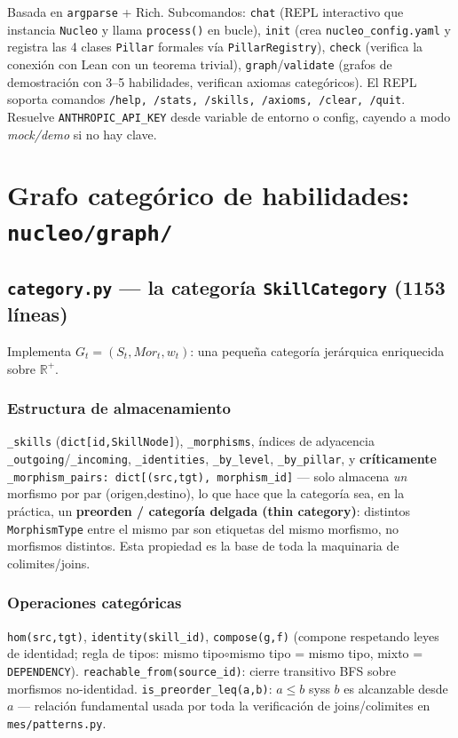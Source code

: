 \documentclass[11pt,a4paper]{report}
\newcommand{\code}[1]{\texttt{#1}}
\begin{document}
Basada en \code{argparse} + Rich. Subcomandos: \code{chat} (REPL interactivo que instancia \code{Nucleo} y llama \code{process()} en bucle), \code{init} (crea \code{nucleo_config.yaml} y registra las 4 clases \code{Pillar} formales v\'ia \code{PillarRegistry}), \code{check} (verifica la conexi\'on con Lean con un teorema trivial), \code{graph}/\code{validate} (grafos de demostraci\'on con 3--5 habilidades, verifican axiomas categ\'oricos). El REPL soporta comandos \code{/help, /stats, /skills, /axioms, /clear, /quit}. Resuelve \code{ANTHROPIC_API_KEY} desde variable de entorno o config, cayendo a modo \emph{mock/demo} si no hay clave.

\chapter{Grafo categ\'orico de habilidades: \code{nucleo/graph/}}

\section{\code{category.py} --- la categor\'ia \code{SkillCategory} (1153 l\'ineas)}

Implementa $G_t=(S_t, Mor_t, w_t)$: una peque\~na categor\'ia jer\'arquica enriquecida sobre $\mathbb{R}^+$.

\subsection{Estructura de almacenamiento}
\code{\_skills} (\code{dict[id,SkillNode]}), \code{\_morphisms}, \'indices de adyacencia \code{\_outgoing}/\code{\_incoming}, \code{\_identities}, \code{\_by_level}, \code{\_by_pillar}, y \textbf{cr\'iticamente} \code{\_morphism_pairs: dict[(src,tgt), morphism_id]} --- solo almacena \emph{un} morfismo por par (origen,destino), lo que hace que la categor\'ia sea, en la pr\'actica, un \textbf{preorden / categor\'ia delgada (thin category)}: distintos \code{MorphismType} entre el mismo par son etiquetas del mismo morfismo, no morfismos distintos. Esta propiedad es la base de toda la maquinaria de colimites/joins.

\subsection{Operaciones categ\'oricas}
\code{hom(src,tgt)}, \code{identity(skill_id)}, \code{compose(g,f)} (compone respetando leyes de identidad; regla de tipos: mismo tipo$\circ$mismo tipo = mismo tipo, mixto = \code{DEPENDENCY}). \code{reachable_from(source_id)}: cierre transitivo BFS sobre morfismos no-identidad. \code{is_preorder_leq(a,b)}: $a\le b$ syss $b$ es alcanzable desde $a$ --- relaci\'on fundamental usada por toda la verificaci\'on de joins/colimites en \code{mes/patterns.py}.
\end{document}
